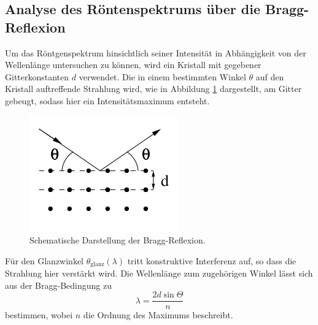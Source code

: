 \subsection{Analyse des Röntenspektrums über die Bragg-Reflexion}
Um das Röntgenspektrum hinsichtlich seiner Intensität in Abhängigkeit von der Wellenlänge untersuchen zu können, wird ein Kristall mit gegebener Gitterkonstanten $d$ verwendet.
Die in einem bestimmten Winkel $\theta$ auf den Kristall auftreffende Strahlung wird, wie in Abbildung \ref{abb:2} dargestellt, am Gitter gebeugt, sodass hier ein Intensitätsmaximum entsteht.
\begin{figure}[H]
  \centering
  \includegraphics[height=5cm]{ressources/bragg.png}
  \caption{Schematische Darstellung der Bragg-Reflexion.\cite{skript}}
  \label{abb:2}
\end{figure}
Für den Glanzwinkel $\theta_{\text{glanz}}(\lambda)$ tritt konstruktive Interferenz auf, so dass die Strahlung hier verstärkt wird.
Die Wellenlänge zum zugehörigen Winkel lässt sich aus der Bragg-Bedingung zu
\begin{equation}
  \lambda = \frac{2 d \sin{\Theta}}{n}
  \label{eqn:bragg}
\end{equation}
bestimmen, wobei $n$ die Ordnung des Maximums beschreibt.
